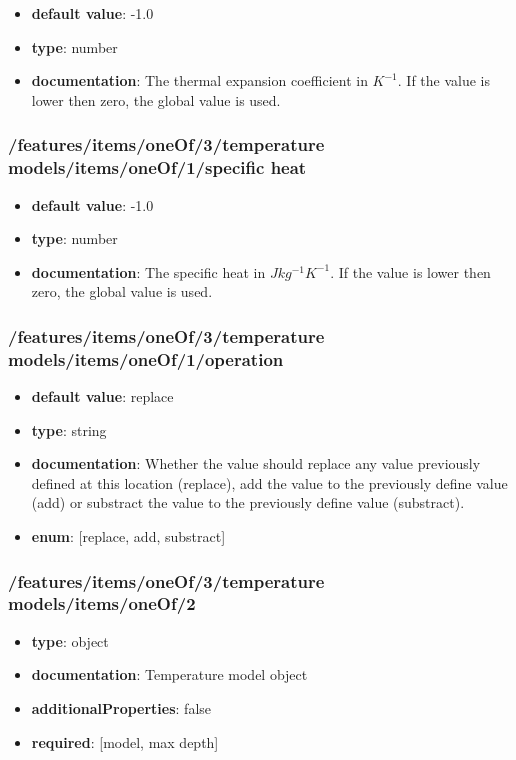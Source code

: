 \begin{itemize}\item {\bf default value}: -1.0
\item {\bf type}: number
\item {\bf documentation}: The thermal expansion coefficient in $K^{-1}$. If the value is lower then zero, the global value is used.
\end{itemize}\subsubsection{/features/items/oneOf/3/temperature models/items/oneOf/1/specific heat}
\begin{itemize}\item {\bf default value}: -1.0
\item {\bf type}: number
\item {\bf documentation}: The specific heat in $J kg^{-1} K^{-1}$. If the value is lower then zero, the global value is used.
\end{itemize}\subsubsection{/features/items/oneOf/3/temperature models/items/oneOf/1/operation}
\begin{itemize}\item {\bf default value}: replace
\item {\bf type}: string
\item {\bf documentation}: Whether the value should replace any value previously defined at this location (replace), add the value to the previously define value (add) or substract the value to the previously define value (substract).
\item {\bf enum}: [replace, add, substract]\end{itemize}\subsubsection{/features/items/oneOf/3/temperature models/items/oneOf/2}
\begin{itemize}\item {\bf type}: object
\item {\bf documentation}: Temperature model object
\item {\bf additionalProperties}: false
\item {\bf required}: [model, max depth]\end{itemize}

